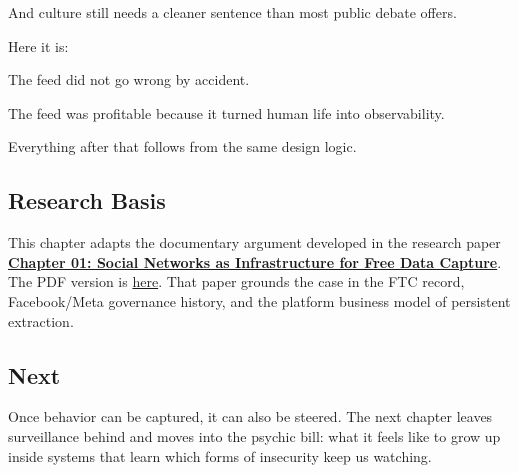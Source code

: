 \documentclass[
  american,
  12pt,
  letterpaper,
]{article}
\begin{document}
And culture still needs a cleaner sentence than most public debate
offers.

Here it is:

The feed did not go wrong by accident.

The feed was profitable because it turned human life into observability.

Everything after that follows from the same design logic.

\subsection{Research Basis}\label{research-basis}

This chapter adapts the documentary argument developed in the research
paper
\href{../../papers/html/01_social-networks-data-capture_paper.html}{\textbf{Chapter
01: Social Networks as Infrastructure for Free Data Capture}}. The PDF
version is
\href{../../papers/pdf/01_social-networks-data-capture_paper/01_social-networks-data-capture_paper.pdf}{here}.
That paper grounds the case in the FTC record, Facebook/Meta governance
history, and the platform business model of persistent extraction.

\subsection{Next}\label{next}

Once behavior can be captured, it can also be steered. The next chapter
leaves surveillance behind and moves into the psychic bill: what it
feels like to grow up inside systems that learn which forms of
insecurity keep us watching.
\end{document}
